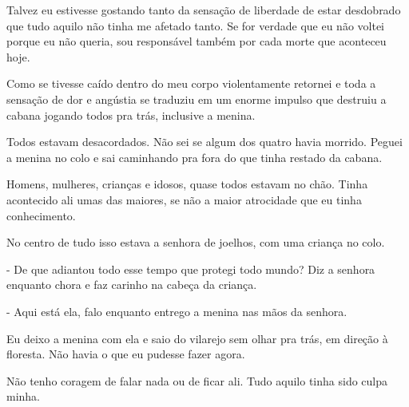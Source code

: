 Talvez eu estivesse gostando tanto da sensação de liberdade de estar desdobrado que tudo aquilo não tinha me afetado tanto. Se for verdade que eu não voltei porque eu não queria, sou responsável também por cada morte que aconteceu hoje.

Como se tivesse caído dentro do meu corpo violentamente retornei e toda a sensação de dor e angústia se traduziu em um enorme impulso que destruiu a cabana jogando todos pra trás, inclusive a menina.

Todos estavam desacordados. Não sei se algum dos quatro havia morrido. Peguei a menina no colo e sai caminhando pra fora do que tinha restado da cabana.

Homens, mulheres, crianças e idosos, quase todos estavam no chão. Tinha acontecido ali umas das maiores, se não a maior atrocidade que eu tinha conhecimento.

No centro de tudo isso estava a senhora de joelhos, com uma criança no colo.

- De que adiantou todo esse tempo que protegi todo mundo? Diz a senhora enquanto chora e faz carinho na cabeça da criança.

- Aqui está ela, falo enquanto entrego a menina nas mãos da senhora.

Eu deixo a menina com ela e saio do vilarejo sem olhar pra trás, em direção à floresta. Não havia o que eu pudesse fazer agora.

Não tenho coragem de falar nada ou de ficar ali. Tudo aquilo tinha sido culpa minha.





